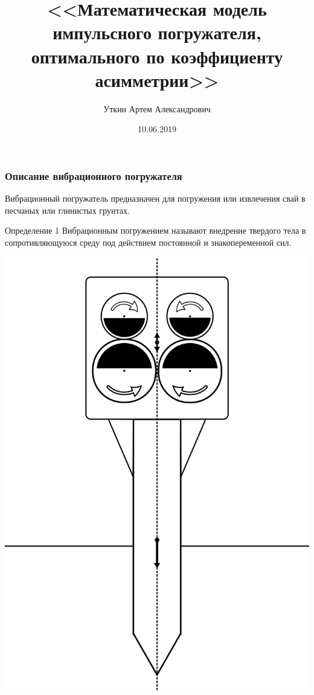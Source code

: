 \documentclass[10pt, pdf, hyperref={unicode}]{beamer}
\title{<<Математическая модель импульсного погружателя, оптимального по коэффициенту асимметрии>>}
\date{10.06.2019}
\author{Уткин Артем Александрович}
\begin{document}
    
    \begin{frame} %
        \titlepage
    \end{frame}


    \begin{frame}
                \begin{minipage}[h]{0.5\linewidth}
                    \frametitle{Описание вибрационного погружателя}
                    Вибрационный погружатель предназначен для погружения или извлечения свай в песчаных или глинистых грунтах.
                    \begin{block}{Определение 1}
                        Вибрационным погружением называют внедрение твердого тела в сопротивляющуюся среду под действием постоянной и знакопеременной сил.
                    \end{block}
                \end{minipage}
                \hfill 
                \begin{minipage}[h]{0.4\linewidth}
                        \includegraphics[width=1\linewidth]{../img/scheme_porg.png}

\end{minipage}
\end{frame}
\end{document}

